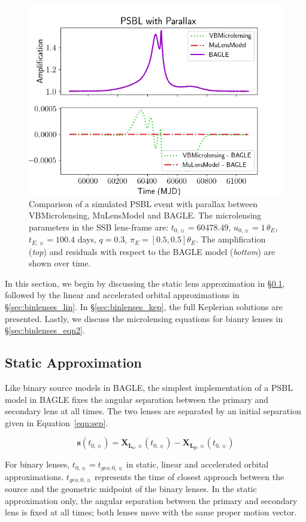 \documentclass[twocolumn]{aastex701}
\newcommand{\vect}[1]{\boldsymbol{#1}}
\newcommand{\tnot}{t_{0,\sun}}
\newcommand{\tE}{t_{E,\sun}}
\newcommand{\thetaE}{\theta_E}
\newcommand{\uo}{u_{0,\sun}}
\newcommand{\piE}{\pi_E}
\newcommand{\Xlpvec}{\vect{X}_{\boldsymbol{L_p},\sun}}
\newcommand{\Xlsvec}{\vect{X}_{\boldsymbol{L_s},\sun}}
\begin{document}
\begin{figure}
    \centering
    \includegraphics[width= .48 \textwidth]{figures/parallax_comparison.png}
    \caption{Comparison of a simulated PSBL event with parallax between VBMicrolensing, MuLensModel and BAGLE. The microlensing parameters in the SSB lens-frame are: $\tnot = 60478.49$, $\uo=1 \,\thetaE$, $\tE = 100.4$ days, $q = 0.3$, $\piE = [0.5, 0.5] \thetaE$. The amplification  ({\em top}) and residuals with respect to the BAGLE model ({\em bottom}) are shown over time.}
    \label{fig:parallax_comparison}
\end{figure}



In this section, we begin by discussing the static lens approximation in \S\ref{sec:binlenses_static}, followed by the linear and accelerated orbital approximations in \S\ref{sec:binlenses_lin}. In \S\ref{sec:binlenses_kep}, the full Keplerian solutions are presented. Lastly, we discuss the microlensing equations for bianry lenses in \S\ref{sec:binlenses_eqn2}.

\subsection{Static Approximation}
\label{sec:binlenses_static}

Like binary source models in BAGLE, the simplest implementation of a PSBL model in BAGLE fixes the angular separation between the primary and secondary lens at all times. The two lenses are separated by an initial separation given in Equation~\ref{eqn:sep}.

\begin{equation}
    \label{eqn:sep}
    \vect{s}(\tnot) = \Xlsvec(\tnot) - \Xlpvec(\tnot)
\end{equation}

For binary lenses, $\tnot=t_{geo, 0, \sun}$ in static, linear and accelerated orbital approximations. $t_{geo, 0, \sun}$ represents the time of closest approach between the source and the geometric midpoint of the binary lenses. In the static approximation only, the angular separation between the primary and secondary lens is fixed at all times; both lenses move with the same proper motion vector. 
\end{document}
